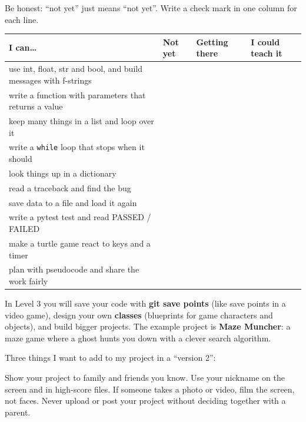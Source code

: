 \begin{exercise}
Be honest: \enquote{not yet} just means \enquote{not yet}. Write a check mark in one column for each line.

\renewcommand{\arraystretch}{1.45}
\begin{tabularx}{\linewidth}{|X|p{1.7cm}|p{1.9cm}|p{1.9cm}|}
\hline
\textbf{I can…} & \textbf{Not yet} & \textbf{Getting there} & \textbf{I could teach it} \\ \hline
use int, float, str and bool, and build messages with f-strings & & & \\ \hline
write a function with parameters that returns a value & & & \\ \hline
keep many things in a list and loop over it & & & \\ \hline
write a \texttt{while} loop that stops when it should & & & \\ \hline
look things up in a dictionary & & & \\ \hline
read a traceback and find the bug & & & \\ \hline
save data to a file and load it again & & & \\ \hline
write a pytest test and read PASSED / FAILED & & & \\ \hline
make a turtle game react to keys and a timer & & & \\ \hline
plan with pseudocode and share the work fairly & & & \\ \hline
\end{tabularx}
\end{exercise}

\begin{exercise}
In Level 3 you will save your code with \textbf{git save points} (like save points in a video game),
design your own \textbf{classes} (blueprints for game characters and objects), and build bigger
projects. The example project is \textbf{Maze Muncher}: a maze game where a ghost hunts you down with a
clever search algorithm.

Three things I want to add to my project in a \enquote{version 2}:
\end{exercise}

\begin{safety}
Show your project to family and friends you know. Use your nickname on the screen and in high-score
files. If someone takes a photo or video, film the screen, not faces. Never upload or post your
project without deciding together with a parent.
\end{safety}

